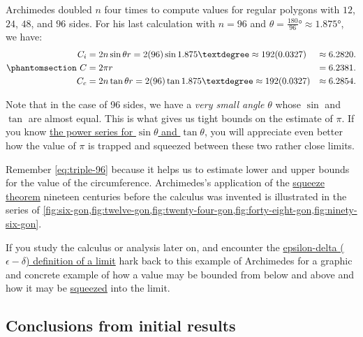 \documentclass[
  a4paper,
]{article}
\begin{document}
Archimedes doubled \(n\) four times to compute values for regular
polygons with \(12\), \(24\), \(48\), and \(96\) sides. For his last
calculation with \(n = 96\) and
\(\theta = \tfrac{180}{96}° \approx 1.875°\), we have:
\begin{equation}\phantomsection\label{eq:triple-96}{
\begin{aligned}
C_i &= 2n\sin\theta r = 2(96)\sin{1.875°} \approx 192(0.0327) &\approx 6.2820.\\
C &= 2\pi r &= 6.2381.\\
C_c &= 2n\tan\theta r = 2(96)\tan{1.875°} \approx 192(0.0327) &\approx 6.2854.\\
\end{aligned}
}\end{equation}

Note that in the case of 96 sides, we have a \emph{very small angle}
\(\theta\) whose \(\sin\) and \(\tan\) are almost equal. This is what
gives us tight bounds on the estimate of \(\pi\). If you know
\href{https://math.libretexts.org/Bookshelves/Differential_Equations/A_First_Course_in_Differential_Equations_for_Scientists_and_Engineers_(Herman)/08:_Appendix_Calculus_Review/8.07:_Power_Series}{the
power series for \(\sin\theta\) and \(\tan\theta\)}, you will appreciate
even better how the value of \(\pi\) is trapped and squeezed between
these two rather close limits.

Remember \cref{eq:triple-96} because it helps us to estimate lower and
upper bounds for the value of the circumference. Archimedes's
application of the
\href{https://en.wikipedia.org/wiki/Squeeze_theorem}{squeeze theorem}
nineteen centuries before the calculus was invented is illustrated in
the series of
\cref{fig:six-gon,fig:twelve-gon,fig:twenty-four-gon,fig:forty-eight-gon,fig:ninety-six-gon}.

If you study the calculus or analysis later on, and encounter the
\href{https://en.wikipedia.org/wiki/Limit_of_a_function}{epsilon-delta
(\(\epsilon-\delta\)) definition of a limit} hark back to this example
of Archimedes for a graphic and concrete example of how a value may be
bounded from below and above and how it may be
\href{https://demonstrations.wolfram.com/SqueezeTheorem/}{squeezed} into
the limit.

\subsection{Conclusions from initial
results}\label{conclusions-from-initial-results}
\end{document}
